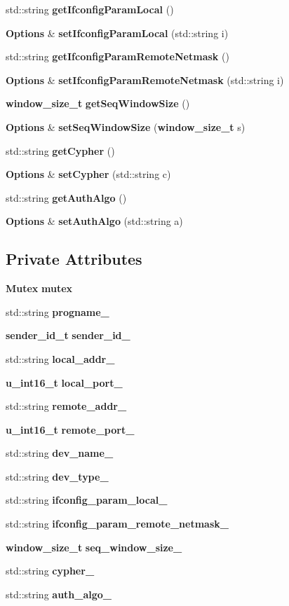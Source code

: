 \begin{CompactItemize}
std::string {\bf get\-Ifconfig\-Param\-Local} ()
\item 
{\bf Options} \& {\bf set\-Ifconfig\-Param\-Local} (std::string i)
\item 
std::string {\bf get\-Ifconfig\-Param\-Remote\-Netmask} ()
\item 
{\bf Options} \& {\bf set\-Ifconfig\-Param\-Remote\-Netmask} (std::string i)
\item 
{\bf window\_\-size\_\-t} {\bf get\-Seq\-Window\-Size} ()
\item 
{\bf Options} \& {\bf set\-Seq\-Window\-Size} ({\bf window\_\-size\_\-t} s)
\item 
std::string {\bf get\-Cypher} ()
\item 
{\bf Options} \& {\bf set\-Cypher} (std::string c)
\item 
std::string {\bf get\-Auth\-Algo} ()
\item 
{\bf Options} \& {\bf set\-Auth\-Algo} (std::string a)
\end{CompactItemize}
\subsection*{Private Attributes}
\begin{CompactItemize}
\item 
{\bf Mutex} {\bf mutex}
\item 
std::string {\bf progname\_\-}
\item 
{\bf sender\_\-id\_\-t} {\bf sender\_\-id\_\-}
\item 
std::string {\bf local\_\-addr\_\-}
\item 
{\bf u\_\-int16\_\-t} {\bf local\_\-port\_\-}
\item 
std::string {\bf remote\_\-addr\_\-}
\item 
{\bf u\_\-int16\_\-t} {\bf remote\_\-port\_\-}
\item 
std::string {\bf dev\_\-name\_\-}
\item 
std::string {\bf dev\_\-type\_\-}
\item 
std::string {\bf ifconfig\_\-param\_\-local\_\-}
\item 
std::string {\bf ifconfig\_\-param\_\-remote\_\-netmask\_\-}
\item 
{\bf window\_\-size\_\-t} {\bf seq\_\-window\_\-size\_\-}
\item 
std::string {\bf cypher\_\-}
\item 
std::string {\bf auth\_\-algo\_\-}
\end{CompactItemize}


